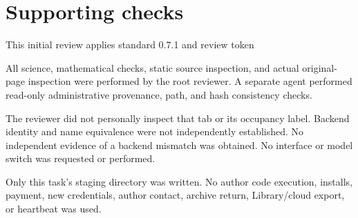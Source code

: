 \documentclass[10pt]{article}
\begin{document}
\section*{Supporting checks}
This initial review applies standard 0.7.1 and review token\par
All science, mathematical checks, static source inspection, and actual original-page inspection were performed by the root reviewer. A separate agent performed read-only administrative provenance, path, and hash consistency checks.\par
The reviewer did not personally inspect that tab or its occupancy label. Backend identity and name equivalence were not independently established. No independent evidence of a backend mismatch was obtained. No interface or model switch was requested or performed.\par
Only this task’s staging directory was written. No author code execution, installs, payment, new credentials, author contact, archive return, Library/cloud export, or heartbeat was used.\par
\end{document}
